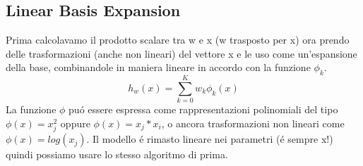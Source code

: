 \documentclass{article}
\begin{document}
\subsection{Linear Basis Expansion}
Prima calcolavamo il prodotto scalare tra w e x (w trasposto per x) ora prendo delle trasformazioni (anche non lineari) del vettore x e le uso come un'espansione della base, combinandole in maniera lineare in accordo con la funzione $\phi_k$. 
\begin{equation}
    h_w(x)=\sum_{k=0}^K w_k \phi_k(x)
\end{equation}
La funzione $\phi$ puó essere espressa come rappresentazioni polinomiali del tipo $\phi(x)=x_j^2$ oppure $\phi(x)=x_j*x_i$, o ancora trasformazioni non lineari come $\phi(x)=log(x_j)$. Il modello é rimasto lineare nei parametri (é sempre x!) quindi possiamo usare lo stesso algoritmo di prima. 
\end{document}
